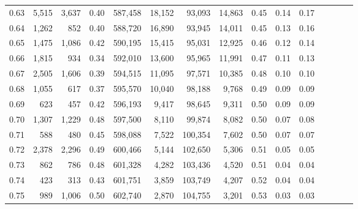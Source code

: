 \begin{tabular}{rrrcrrrrrrrrrrr}
0.63 &   5,515 &  3,637 &                                       0.40 &  587,458 &   18,152 &   93,093 &   14,863 &  0.45 &  0.14 &                         0.17 \\
0.64 &   1,262 &    852 &                                       0.40 &  588,720 &   16,890 &   93,945 &   14,011 &  0.45 &  0.13 &                         0.16 \\
0.65 &   1,475 &  1,086 &                                       0.42 &  590,195 &   15,415 &   95,031 &   12,925 &  0.46 &  0.12 &                         0.14 \\
0.66 &   1,815 &    934 &                                       0.34 &  592,010 &   13,600 &   95,965 &   11,991 &  0.47 &  0.11 &                         0.13 \\
0.67 &   2,505 &  1,606 &                                       0.39 &  594,515 &   11,095 &   97,571 &   10,385 &  0.48 &  0.10 &                         0.10 \\
0.68 &   1,055 &    617 &                                       0.37 &  595,570 &   10,040 &   98,188 &    9,768 &  0.49 &  0.09 &                         0.09 \\
0.69 &     623 &    457 &                                       0.42 &  596,193 &    9,417 &   98,645 &    9,311 &  0.50 &  0.09 &                         0.09 \\
0.70 &   1,307 &  1,229 &                                       0.48 &  597,500 &    8,110 &   99,874 &    8,082 &  0.50 &  0.07 &                         0.08 \\
0.71 &     588 &    480 &                                       0.45 &  598,088 &    7,522 &  100,354 &    7,602 &  0.50 &  0.07 &                         0.07 \\
0.72 &   2,378 &  2,296 &                                       0.49 &  600,466 &    5,144 &  102,650 &    5,306 &  0.51 &  0.05 &                         0.05 \\
0.73 &     862 &    786 &                                       0.48 &  601,328 &    4,282 &  103,436 &    4,520 &  0.51 &  0.04 &                         0.04 \\
0.74 &     423 &    313 &                                       0.43 &  601,751 &    3,859 &  103,749 &    4,207 &  0.52 &  0.04 &                         0.04 \\
0.75 &     989 &  1,006 &                                       0.50 &  602,740 &    2,870 &  104,755 &    3,201 &  0.53 &  0.03 &                         0.03 \\

\end{tabular}
